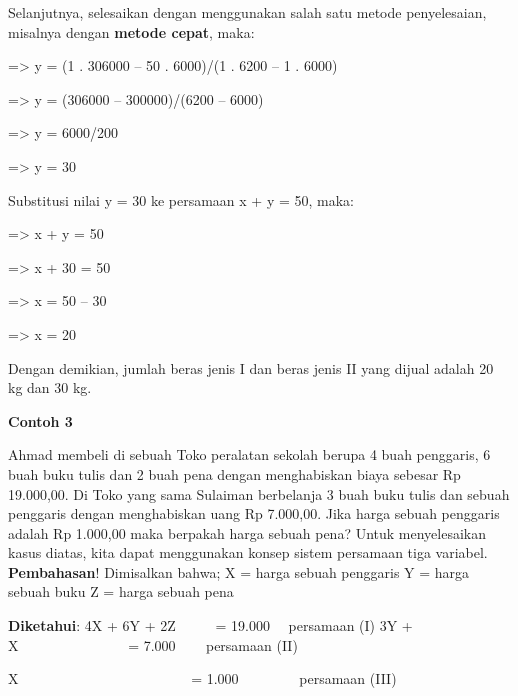 \documentclass[11pt,fleqn]{book} %
\begin{document}
\begin{myEnumerate}
\begin{itemize}
		\noindent 
		Selanjutnya, selesaikan dengan menggunakan salah satu metode penyelesaian, misalnya dengan $  $\textbf{metode cepat}, maka: \par
		\noindent 
		=> y = (1 . 306000 – 50 . 6000)/(1 . 6200 – 1 . 6000) \par
		\noindent 
		=> y = (306000 – 300000)/(6200 – 6000) \par
		\noindent 
		=> y = 6000/200 \par
		\noindent 
		=> y = 30 \par
		\noindent 
		Substitusi nilai y = 30 ke persamaan x + y = 50, maka: \par
		\noindent 
		=> x + y = 50 \par
		\noindent 
		=> x + 30 = 50 \par
		\noindent 
		=> x = 50 – 30 \par
		\noindent 
		=> x = 20 \par
		\noindent 
		Dengan demikian, jumlah beras jenis I dan beras jenis II yang dijual adalah 20 kg dan 30 kg. \par
		\vspace{12pt}
		\noindent 
		\textbf{Contoh 3} \par
		\noindent 
		Ahmad membeli di sebuah Toko peralatan sekolah berupa 4 buah penggaris, 6 buah buku tulis dan 2 buah pena dengan menghabiskan biaya sebesar Rp 19.000,00. Di Toko yang sama Sulaiman berbelanja 3 buah buku tulis dan sebuah penggaris dengan menghabiskan uang Rp 7.000,00. Jika harga sebuah penggaris adalah Rp 1.000,00 maka berpakah harga sebuah pena? Untuk menyelesaikan kasus diatas, kita dapat menggunakan konsep sistem persamaan tiga variabel.\vspace{\baselineskip}
		\vspace{\baselineskip}
		\textbf{Pembahasan}!\vspace{\baselineskip}
		Dimisalkan bahwa;\vspace{\baselineskip}
		X = harga sebuah penggaris\vspace{\baselineskip}
		Y = harga sebuah buku\vspace{\baselineskip}
		Z = harga sebuah pena \par
		\noindent 
		\textbf{Diketahui}:\vspace{\baselineskip}
		4X + 6Y + 2Z~~~~~ = 19.000  $  $  $  $ $  $ persamaan (I)\vspace{\baselineskip}
		3Y + X~~~~~~~~~~~~~~~ = 7.000  $  $  $  $  $  $ $  $~ persamaan (II) \par
		\noindent 
		X~~~~~~~~~~~~~~~~~~~~~~~~ = 1.000~~~~~~~~ persamaan (III)\vspace{\baselineskip}

\end{itemize}
\end{myEnumerate}
\end{document}
